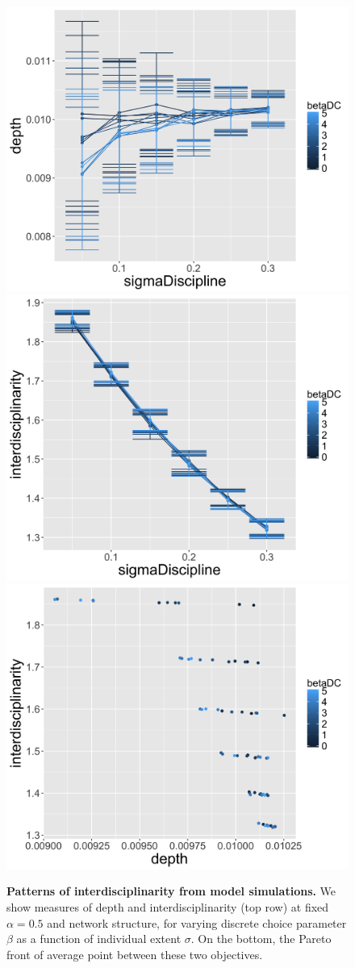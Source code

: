 \documentclass[utf8,11pt]{article}
\begin{document}
\begin{figure}
	\centering
	\includegraphics[width=0.49\linewidth]{depth-sigma_alpha0-5_rho0}
	\includegraphics[width=0.49\linewidth]{interdisc-sigma_alpha0-5_rho0}\\
	\includegraphics[width=0.8\linewidth]{pareto_alpha0-5_rho0}
	\caption{\textbf{Patterns of interdisciplinarity from model simulations.} We show measures of depth and interdisciplinarity (top row) at fixed $\alpha=0.5$ and network structure, for varying discrete choice parameter $\beta$ as a function of individual extent $\sigma$. On the bottom, the Pareto front of average point between these two objectives.}
	\label{fig:plots}
\end{figure}
\end{document}
